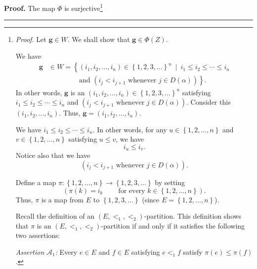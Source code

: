 \documentclass[numbers=enddot,12pt,final,onecolumn,notitlepage,abstracton]{scrartcl}
\theoremstyle{definition}
\newenvironment{proof}[1][Proof]{\noindent\textbf{#1.} }{\ \rule{0.5em}{0.5em}}
\newenvironment{verlong}{}{}
\begin{document}
\begin{verlong}
\begin{footnotesize}
\begin{proof}
The map $\Phi$ is surjective\footnote{\textit{Proof.} Let $\mathbf{g}\in W$.
We shall show that $\mathbf{g}\in\Phi\left(  Z\right)  $.
\par
We have%
\begin{align*}
\mathbf{g}  &  \in W=\left\{  \left(  i_{1},i_{2},\ldots,i_{n}\right)
\in\left\{  1,2,3,\ldots\right\}  ^{n}\ \mid\ i_{1}\leq i_{2}\leq\cdots\leq
i_{n}\right. \\
&  \ \ \ \ \ \ \ \ \ \ \ \ \ \ \ \ \ \ \ \ \left.  \text{and }\left(
i_{j}<i_{j+1}\text{ whenever }j\in D\left(  \alpha\right)  \right)  \right\}
.
\end{align*}
In other words, $\mathbf{g}$ is an $\left(  i_{1},i_{2},\ldots,i_{n}\right)
\in\left\{  1,2,3,\ldots\right\}  ^{n}$ satisfying $i_{1}\leq i_{2}\leq
\cdots\leq i_{n}$ and $\left(  i_{j}<i_{j+1}\text{ whenever }j\in D\left(
\alpha\right)  \right)  $. Consider this $\left(  i_{1},i_{2},\ldots
,i_{n}\right)  $. Thus, $\mathbf{g}=\left(  i_{1},i_{2},\ldots,i_{n}\right)
$.
\par
We have $i_{1}\leq i_{2}\leq\cdots\leq i_{n}$. In other words, for any
$u\in\left\{  1,2,\ldots,n\right\}  $ and $v\in\left\{  1,2,\ldots,n\right\}
$ satisfying $u\leq v$, we have%
\begin{equation}
i_{u}\leq i_{v}. \label{pf.prop.example.Gamma.c3.surj.1}%
\end{equation}
Notice also that we have%
\begin{equation}
\left(  i_{j}<i_{j+1}\text{ whenever }j\in D\left(  \alpha\right)  \right)  .
\label{pf.prop.example.Gamma.c3.surj.2}%
\end{equation}
\par
Define a map $\pi:\left\{  1,2,\ldots,n\right\}  \rightarrow\left\{
1,2,3,\ldots\right\}  $ by setting%
\[
\left(  \pi\left(  k\right)  =i_{k}\ \ \ \ \ \ \ \ \ \ \text{for every }%
k\in\left\{  1,2,\ldots,n\right\}  \right)  .
\]
Thus,
$\pi$ is a map from $E$ to $\left\{  1,2,3,\ldots\right\}  $ (since
$E=\left\{  1,2,\ldots,n\right\}  $).
\par
Recall the definition of an $\left(  E,<_{1},<_{2}\right)  $-partition. This
definition shows that $\pi$ is an $\left(  E,<_{1},<_{2}\right)  $-partition
if and only if it satisfies the following two assertions:
\par
\textit{Assertion }$\mathcal{A}_{1}$\textit{:} Every $e\in E$ and $f\in E$
satisfying $e<_{1}f$ satisfy $\pi\left(  e\right)  \leq\pi\left(  f\right)  $.
}
\end{proof}
\end{footnotesize}
\end{verlong}
\end{document}
